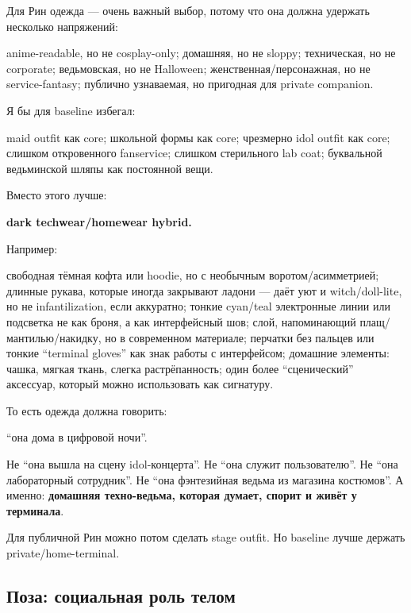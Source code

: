 Для Рин одежда --- очень важный выбор, потому что она должна удержать
несколько напряжений:

anime-readable, но не cosplay-only; домашняя, но не sloppy; техническая,
но не corporate; ведьмовская, но не Halloween; женственная/\hspace{0pt}персонажная,
но не service-fantasy; публично узнаваемая, но пригодная для private
companion.

Я бы для baseline избегал:

maid outfit как core; школьной формы как core; чрезмерно idol outfit как
core; слишком откровенного fanservice; слишком стерильного lab coat;
буквальной ведьминской шляпы как постоянной вещи.

Вместо этого лучше:

\textbf{dark techwear/\hspace{0pt}homewear hybrid.}

Например:

свободная тёмная кофта или hoodie, но с необычным воротом/\hspace{0pt}асимметрией;
длинные рукава, которые иногда закрывают ладони --- даёт уют и
witch/\hspace{0pt}doll-lite, но не infantilization, если аккуратно; тонкие cyan/\hspace{0pt}teal
электронные линии или подсветка не как броня, а как интерфейсный шов;
слой, напоминающий плащ/\hspace{0pt}мантилью/\hspace{0pt}накидку, но в современном материале;
перчатки без пальцев или тонкие ``terminal gloves'' как знак работы с
интерфейсом; домашние элементы: чашка, мягкая ткань, слегка
растрёпанность; один более ``сценический'' аксессуар, который можно
использовать как сигнатуру.

То есть одежда должна говорить:

``она дома в цифровой ночи''.

Не ``она вышла на сцену idol-концерта''. Не ``она служит пользователю''.
Не ``она лабораторный сотрудник''. Не ``она фэнтезийная ведьма из
магазина костюмов''. А именно: \textbf{домашняя техно-ведьма, которая
думает, спорит и живёт у терминала}.

Для публичной Рин можно потом сделать stage outfit. Но baseline лучше
держать private/\hspace{0pt}home-terminal.

\subsection*{Поза: социальная роль телом}

